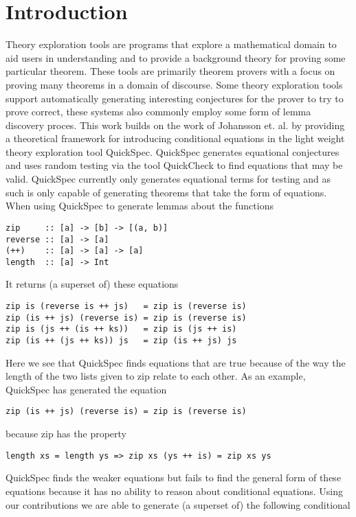 \section{Introduction}
Theory exploration tools are programs that
explore a mathematical domain to aid users in
understanding and to provide a background theory
for proving some particular theorem\cite{Johansson2014}. 
These tools are primarily theorem provers with a focus
on proving many theorems in a domain of discourse.
Some theory exploration tools support automatically generating
interesting conjectures for the prover to try to prove correct,
these systems also commonly employ some form of lemma discovery proces\cite{heras2013}.
This work builds on the work of Johansson et. al. \cite{Johansson2014}
by providing a theoretical framework for introducing conditional
equations in the light weight theory exploration tool QuickSpec.\cite{Claessen2010} 
QuickSpec generates equational conjectures and uses random testing via the tool QuickCheck \cite{Claessen2000}
to find equations that may be valid. QuickSpec currently only generates
equational terms for testing and as such is only capable of generating
theorems that take the form of equations. 
When using QuickSpec to generate lemmas about the functions
\begin{verbatim}
zip     :: [a] -> [b] -> [(a, b)]
reverse :: [a] -> [a]
(++)    :: [a] -> [a] -> [a]
length  :: [a] -> Int
\end{verbatim}
It returns (a superset of) these equations
\begin{verbatim}
zip is (reverse is ++ js)   = zip is (reverse is)
zip (is ++ js) (reverse is) = zip is (reverse is)
zip is (js ++ (is ++ ks))   = zip is (js ++ is)
zip (is ++ (js ++ ks)) js   = zip (is ++ js) js
\end{verbatim}
Here we see that QuickSpec finds equations that are true
because of the way the length of the two lists given to zip relate
to each other. As an example, QuickSpec has generated the equation
\begin{verbatim}zip (is ++ js) (reverse is) = zip is (reverse is)\end{verbatim}
because zip has the property \begin{verbatim}length xs = length ys => zip xs (ys ++ is) = zip xs ys\end{verbatim}
QuickSpec finds the weaker equations but fails to find the general form
of these equations because it has no ability to reason about
conditional equations.
Using our contributions we are able to generate (a superset of) the following conditional

